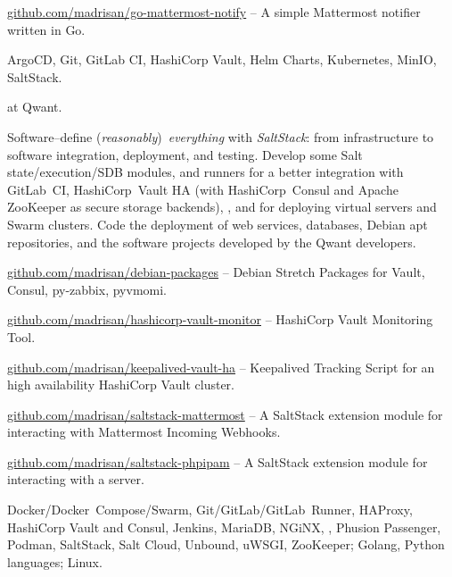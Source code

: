 \smallskip\noindent
\software
\url{github.com/madrisan/go-mattermost-notify} --
A simple Mattermost notifier written in Go.

\smallskip\noindent
\technologies
ArgoCD, Git, GitLab CI, HashiCorp Vault, Helm Charts, Kubernetes, MinIO, SaltStack.




 at Qwant.

\smallskip\noindent
\tasks
Software--define ({\it reasonably}\/)~{\it everything\/} with {\it SaltStack\/}:
from infrastructure to software integration, deployment, and testing.
Develop some Salt state/execution/SDB modules, and runners for a better
integration with GitLab~CI, HashiCorp~Vault HA (with HashiCorp~Consul and
Apache ZooKeeper as secure storage backends), \phpIPAM{}, and for deploying
virtual servers and Swarm clusters.
Code the deployment of web services, databases, Debian apt repositories, and the
software projects developed by the Qwant developers.

\smallskip\noindent
\software
\url{github.com/madrisan/debian-packages} --
Debian Stretch Packages for Vault, Consul, py-zabbix, pyvmomi.

\noindent
\url{github.com/madrisan/hashicorp-vault-monitor} --
HashiCorp Vault Monitoring Tool.

\noindent
\url{github.com/madrisan/keepalived-vault-ha} --
Keepalived Tracking Script for an high availability HashiCorp Vault cluster.

\noindent
\url{github.com/madrisan/saltstack-mattermost} --
A SaltStack extension module for interacting with Mattermost Incoming Webhooks.

\noindent
\url{github.com/madrisan/saltstack-phpipam} --
A SaltStack extension module for interacting with a \phpIPAM{} server.


\smallskip\noindent
\technologies
Docker/Docker~Compose/Swarm, Git/GitLab/GitLab~Runner, HAProxy,
HashiCorp Vault and Consul, Jenkins, MariaDB, NGiNX, \phpIPAM,
Phusion Passenger, Podman, SaltStack, Salt Cloud, Unbound, uWSGI, ZooKeeper;
Golang, Python languages; Linux.


